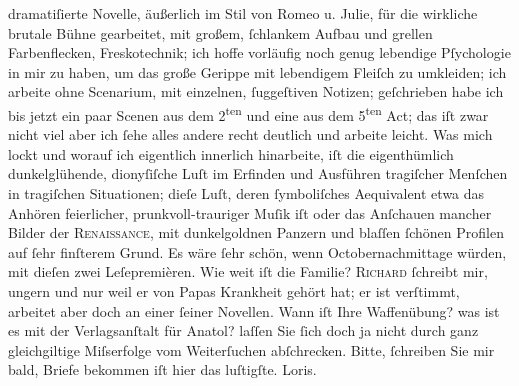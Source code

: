 \begin{ledgroupsized}[t]{13cm}
               dramatiſierte Novelle, äußerlich im Stil von Romeo u.
                  Julie, für die wirkliche brutale Bühne gearbeitet, mit {\pb}großem, ſchlankem Aufbau und
               grellen Farbenflecken, Freskotechnik; ich hoffe vorläufig noch genug lebendige
               Pſychologie in mir zu haben, um das große Gerippe mit lebendigem Fleiſch zu
               umkleiden; ich arbeite ohne Scenarium, mit einzelnen, ſuggeſtiven Notizen;
               geſchrieben habe ich bis jetzt ein paar Scenen aus dem 2\textsuperscript{ten} und eine aus dem 5\textsuperscript{ten} Act; das iſt zwar
               nicht viel aber ich ſehe alles andere recht deutlich und arbeite leicht. Was mich
               lockt und worauf ich eigentlich innerlich hinarbeite, iſt die eigenthümlich
               dunkelglühende, dionyſiſche Luſt im Erfinden und Ausführen tragiſcher Menſchen in
               tragiſchen Situationen; dieſe Luſt, deren ſymboliſches Aequivalent etwa das Anhören
                  {\pb}feierlicher,
               prunkvoll-trauriger Muſik iſt oder das Anſchauen mancher Bilder der \textsc{Renaissance}, mit dunkelgoldnen Panzern und blaſſen ſchönen
               Profilen auf ſehr finſterem Grund. Es wäre ſehr schön, wenn Octobernachmittage
               würden, mit dieſen zwei Leſepremièren. Wie weit iſt die Familie? \hspace*{2em}\textsc{Richard}{ }ſchreibt mir, ungern und nur weil er von Papas Krankheit gehört hat;
               er ist verſtimmt, arbeitet aber doch an einer ſeiner Novellen. Wann iſt Ihre Waffenübung? was
               ist es mit der Verlagsanſtalt für Anatol? laſſen
               Sie ſich doch ja nicht durch ganz gleichgiltige Miſserfolge vom Weiterſuchen
               abſchrecken. Bitte, ſchreiben Sie mir bald, Briefe bekommen iſt hier das
               luſtigſte.\pend
           \pstart \spacefill\mbox{Loris.}\pend{}
         
         \endnumbering{}\end{ledgroupsized}  \newcommand{\dateiname}{L00105}\newcommand{\titel}{Hugo von Hofmannsthal an Arthur Schnitzler, 19. 7. [1892]}\newcommand{\editorInnen}{ Martin Anton Müller und Gerd-Hermann Susen}
      